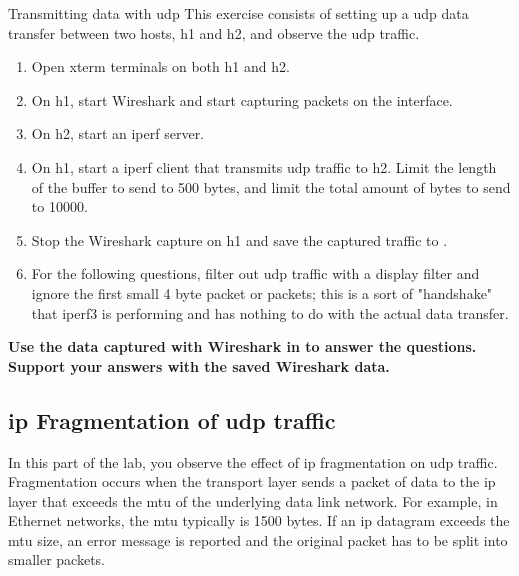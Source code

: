 \begin{exercise}{Transmitting data with \ac{udp}}
This exercise consists of setting up a \ac{udp} data transfer between two hosts, h1 and h2, and observe the \ac{udp} traffic.

\begin{enumerate}
	\item Open xterm terminals on both h1 and h2.
	\item On h1, start Wireshark and start capturing packets on the  interface. 
	\item On h2, start an iperf server.
	\item On h1, start a iperf client that transmits \ac{udp} traffic to h2. Limit the length of the buffer to send to 500 bytes, and limit the total amount of bytes to send to 10000. 
	\item Stop the Wireshark capture on h1 and save the captured traffic to .
	\item For the following questions, filter out \ac{udp} traffic with a display filter and ignore the first small 4 byte packet or packets; this is a sort of "handshake" that iperf3 is performing and has nothing to do with the actual data transfer.
\end{enumerate}

\textbf{Use the data captured with Wireshark in  to answer the questions. Support your answers with the saved Wireshark data.}


\end{exercise}

\newpage
\subsection{\acs{ip} Fragmentation of \ac{udp} traffic}

In this part of the lab, you observe the effect of \acs{ip} fragmentation on \ac{udp} traffic. Fragmentation occurs when the transport layer sends a packet of data to the \acs{ip} layer that exceeds the \acf{mtu} of the underlying data link network. For example, in Ethernet networks, the \ac{mtu} typically is 1500 bytes. If an \acs{ip} datagram exceeds the \ac{mtu} size, an error message is reported and the original packet has to be split into smaller packets.

